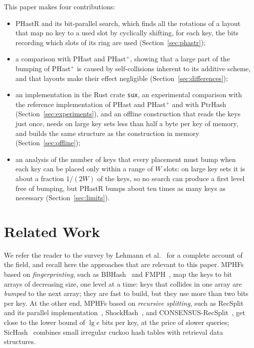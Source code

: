 \documentclass[11pt]{article}
\newcommand{\PHast}{PHast\xspace}
\newcommand{\PHastP}{PHast$^+$\xspace}
\newcommand{\PHastR}{PHastR\xspace}
\begin{document}
This paper makes four contributions:
\begin{itemize}
\item \PHastR and its bit-parallel search, which finds all the rotations of a
layout that map no key to a used slot by cyclically shifting, for each key,
the bits recording which slots of its ring are used
(Section~\ref{sec:phastr});
\item a comparison with \PHast and \PHastP, showing that a large part of the
bumping of \PHastP is caused by self-collisions inherent to its additive
scheme, and that layouts make their effect negligible
(Section~\ref{sec:differences});
\item an implementation in the Rust crate \texttt{sux}, an experimental
comparison with the reference implementation of \PHast and \PHastP and with
PtrHash (Section~\ref{sec:experiments}), and an offline construction that reads the
keys just once, needs on large key sets less than half a byte per key of
memory, and builds the same
structure as the construction in memory (Section~\ref{sec:offline});
\item an analysis of the number of keys that every placement must bump when
each key can be placed only within a range of $W$ slots: on large key sets
it is about a fraction $1/(2W)$ of the keys, so no search can produce a first
level free of bumping, but \PHastR bumps about ten times as many keys as
necessary (Section~\ref{sec:limits}).
\end{itemize}

\section{Related Work}
\label{sec:related}

We refer the reader to the survey by Lehmann et
al.~\cite{LMPPSVWMMPHS} for a complete account of the field, and recall here
the approaches that are relevant to this paper. MPHFs based on
\emph{fingerprinting}, such as BBHash~\cite{LRCPFSMPHMKS} and
FMPH~\cite{BelFBMPHR}, map the keys to bit arrays of decreasing size, one
level at a time: keys that collides in one array are \emph{bumped} to the next array; 
they are fast to build, but they use more than two bits per
key. At the other end, MPHFs based on \emph{recursive splitting}, such as
RecSplit~\cite{EGVRMPHRS} and its parallel implementation~\cite{BKLSHPCRBMPHF},
ShockHash~\cite{LSWSTOSMPHBBF}, and CONSENSUS-RecSplit~\cite{LSWCSESAMPH}, get
close to the lower bound of $\lg e$ bits per key, at the price of slower
queries; SicHash~\cite{LSWSSICTPH} combines small irregular cuckoo hash
tables with retrieval data structures.
\end{document}
